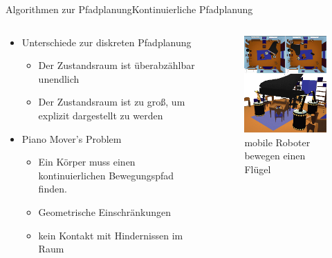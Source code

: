 \documentclass[t,aspectratio=169,dvipsnames]{beamer}
\begin{document}
\begin{frame}{Algorithmen zur Pfadplanung}{Kontinuierliche Pfadplanung}
\begin{columns}
	\begin{column}[T]{0.5\textwidth}
			\begin{itemize}[<+->]
			\item Unterschiede zur diskreten Pfadplanung
			\begin{itemize}
				\item<2-> Der Zustandsraum ist überabzählbar unendlich
				\item<2-> Der Zustandsraum ist zu groß, um explizit dargestellt zu werden
			\end{itemize}
		
			\item<3-> Piano Mover's Problem
			\begin{itemize}
				\item<4-> Ein Körper muss einen kontinuierlichen Bewegungspfad finden.
				\item<4-> Geometrische Einschränkungen
				\item<4-> kein Kontakt mit Hindernissen im Raum
			\end{itemize}	
		\end{itemize}
	\end{column}
	\begin{column}[T]{0.5\textwidth}
		\begin{figure}
			\includegraphics[width=4.0cm]{images/img233.png}
			\caption{mobile Roboter bewegen einen Flügel \cite[Abb.1.5, S.9]{Lav06}}
		\end{figure}
	\end{column}
\end{columns}
\end{frame}
\end{document}
